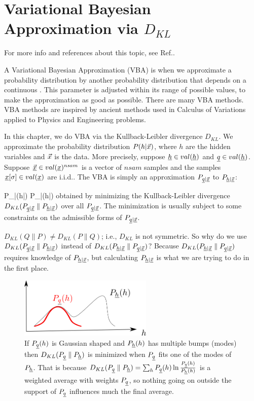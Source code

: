 \chapter{Variational Bayesian Approximation
via $D_{KL}$}

For more info and references about
this topic, see Ref.\cite{wiki-var-bay}.

A Variational Bayesian Approximation (VBA)
is when we approximate
a probability distribution
by another 
probability distribution that depends
on a continuous .
This parameter is
adjusted 
within its range of possible values,
to make the approximation
as good as possible.
There are many VBA methods.
VBA methods are inspired by 
ancient  methods
used in Calculus 
of Variations applied to Physics
and Engineering problems.

In this chapter, we do VBA via 
the Kullback-Leibler divergence $D_{KL}$.
We approximate the probability 
distribution $P(h|{\vec{x}})$,
where $h$ are the hidden variables 
and ${\vec{x}}$ is the data. 
More precisely, suppose $\rvh\in val(\rvh)$ and $\rvq\in val(\rvh)$.
Suppose $\vec{\rvx}\in val(\rvx)^{nsam}$
 is a vector of $nsam$ samples
and the samples $\rvx[\sigma]\in val(\rvx)$ are i.i.d..
 The VBA is simply 
an approximation
$P_{\rvq|\vec{\rvx}}$ to
$P_{\rvh|\vec{\rvx}}$:


\beq
P_{\rvh|\vec{\rvx}}(h|\vecx)
\approx P_{\rvq|\vec{\rvx}}(h|\vecx)
\eeq
obtained by minimizing the Kullback-Leibler divergence
$D_{KL}(P_{\rvq|\vec{\rvx}}\parallel
P_{\rvh|\vec{\rvx}})$
over all 
$P_{\rvq|\vec{\rvx}}$. The minimization
is 
usually subject to some constraints
on the admissible forms of 
$P_{\rvq|\vec{\rvx}}$.


$D_{KL}(Q\parallel P)\neq
D_{KL}(P\parallel Q)$; i.e.,  $D_{KL}$ is not
symmetric. So why do we use 
$D_{KL}(P_{\rvq|\vec{\rvx}}\parallel
P_{\rvh|\vec{\rvx}})$
instead of 
$D_{KL}(
P_{\rvh|\vec{\rvx}}\parallel P_{\rvq|\vec{\rvx}})$?
Because 
$D_{KL}(
P_{\rvh|\vec{\rvx}}\parallel P_{\rvq|\vec{\rvx}})$
requires knowledge of $P_{\rvh|\vec{\rvx}}$,
but calculating $P_{\rvh|\vec{\rvx}}$
is what we are trying to do in the first place.

\begin{figure}[h!]
\centering
\includegraphics[width=2.5in]
{var-bay/kl-q-support.png}
\caption{
If $P_\rvq(h)$
is Gaussian shaped 
and $P_\rvh(h)$
has multiple
bumps (modes)
then 
$D_{KL}(P_\rvq\parallel P_\rvh)$
is minimized when $P_\rvq$
fits one of the modes of $P_\rvh$.
That is because $D_{KL}(P_\rvq\parallel P_\rvh)=
\sum_h P_\rvq(h)\ln \frac{P_\rvq(h)}{P_\rvh(h)}$
is a weighted average with weights $P_\rvq$,
so nothing going on outside the support
of $P_\rvq$ influences  much
the final average.
}
\label{fig-kl-q-support}
\end{figure}


